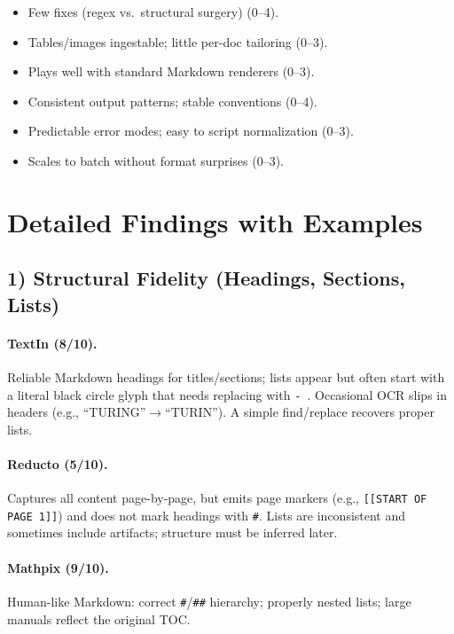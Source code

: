 \documentclass[11pt,a4paper]{article}
\begin{document}
\begin{description}[leftmargin=1.1em,itemsep=0.35em]
    \begin{itemize}[leftmargin=1.2em,itemsep=0.2em]
      \item Few fixes (regex vs.\ structural surgery) (0--4).
      \item Tables/images ingestable; little per-doc tailoring (0--3).
      \item Plays well with standard Markdown renderers (0--3).
    \end{itemize}
  \item[Automation Readiness]
    \begin{itemize}[leftmargin=1.2em,itemsep=0.2em]
      \item Consistent output patterns; stable conventions (0--4).
      \item Predictable error modes; easy to script normalization (0--3).
      \item Scales to batch without format surprises (0--3).
    \end{itemize}
  \end{description}

\section*{Detailed Findings with Examples}

\subsection*{1) Structural Fidelity (Headings, Sections, Lists)}

\paragraph{TextIn (8/10).}
Reliable Markdown headings for titles/sections; lists appear but often start with a literal black circle glyph that needs replacing with \verb|- |. Occasional OCR slips in headers (e.g., “TURING”$\to$“TURIN”). A simple find/replace recovers proper lists.

\paragraph{Reducto (5/10).}
Captures all content page-by-page, but emits page markers (e.g., \verb|[[START OF PAGE 1]]|) and does not mark headings with \verb|#|. Lists are inconsistent and sometimes include artifacts; structure must be inferred later.

\paragraph{Mathpix (9/10).}
Human-like Markdown: correct \verb|#|/\verb|##| hierarchy; properly nested lists; large manuals reflect the original TOC.
\end{document}
